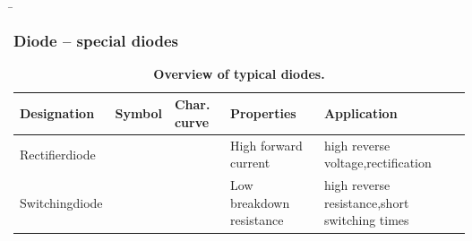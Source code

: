 \begin{frame}
    \renewcommand{\tablename}{Table}
    \b{
        \frametitle{Diode -- special diodes}
        \begin{table}[H]
            \centering 
            \begin{tabular}{ |p{2.1cm}|p{1.4cm}|p{3.2cm}|p{2.8cm}|p{3cm}| }
                \hline
                \textbf{Designation} & \textbf{Symbol} & \textbf{Char. curve} & \textbf{Properties} & \textbf{Application} \\
                \hline
                Rectifier\-diode  
                &
                \begin{minipage}[t][2.6cm][c]{1.4cm}
                    \centering 
                \end{minipage}
                & 
                \begin{minipage}[t][2.6cm][c]{3.3cm}
                    \centering 
                \end{minipage}
                & 
                High forward current &
                high reverse voltage,\newline rectification\\
                \hline
                Switching\-diode 
                &
                \begin{minipage}[t][2.6cm][c]{1.4cm}
                    \centering 
                \end{minipage}
                & 
                \begin{minipage}[t][2.6cm][c]{3.3cm}
                    \centering 
                \end{minipage}
                & 
                Low breakdown resistance &
                high reverse resistance,\newline short switching times\\
                \hline
            \end{tabular}
            \caption{\textbf{Overview of typical diodes.}}
        \end{table}
    }

\end{frame}

